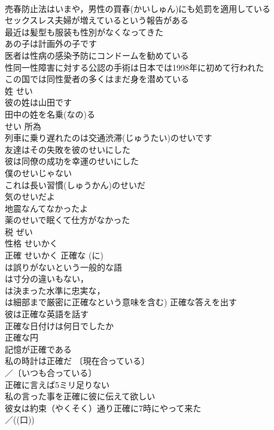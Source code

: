 \documentclass[8pt]{extreport}
\begin{document}
\begin{CJK}{UTF8}{min}
\\	売春防止法はいまや，男性の買春(かいしゅん)にも処罰を適用している 
\\	セックスレス夫婦が増えているという報告がある 
\\	最近は髪型も服装も性別がなくなってきた 
\\	あの子は計画外の子です 
\\	医者は性病の感染予防にコンドームを勧めている 
\\	性同一性障害に対する公認の手術は日本では1998年に初めて行われた 
\\	この国では同性愛者の多くはまだ身を潜めている 
\\	姓	せい	
\\	彼の姓は山田です 
\\	田中の姓を名乗(なの)る 
\\	せい	所為	
\\	列車に乗り遅れたのは交通渋滞(じゅうたい)のせいです 
\\	友達はその失敗を彼のせいにした 
\\	彼は同僚の成功を幸運のせいにした 
\\	僕のせいじゃない 
\\	これは長い習慣(しゅうかん)のせいだ 
\\	気のせいだよ
\\	地震なんてなかったよ 
\\	薬のせいで眠くて仕方がなかった 
\\	税	ぜい	
\\	性格	せいかく	
\\	正確	せいかく	正確な (に) 
\\	は誤りがないという一般的な語
\\	は寸分の違いもない，
\\	は決まった水準に忠実な，
\\	は細部まで厳密に正確なという意味を含む) 正確な答えを出す 
\\	彼は正確な英語を話す 
\\	正確な日付けは何日でしたか 
\\	正確な円 
\\	記憶が正確である 
\\	私の時計は正確だ 〔現在合っている〕
\\	／〔いつも合っている〕
\\	正確に言えば5ミリ足りない 
\\	私の言った事を正確に彼に伝えて欲しい 
\\	彼女は約束（やくそく）通り正確に7時にやって来た 
\\	／((口)) 

\end{CJK}
\end{document}
